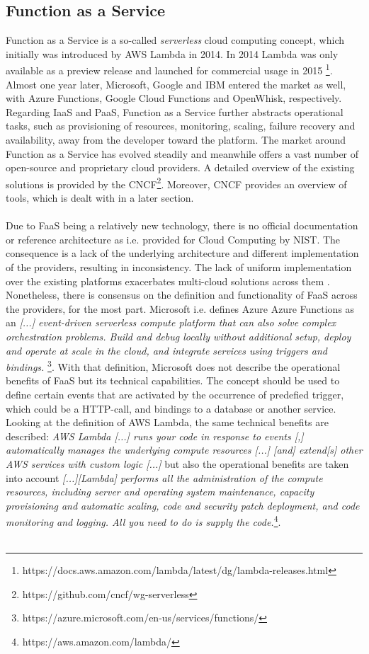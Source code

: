 \documentclass[11pt]{article}
\begin{document}
\subsection{Function as a Service}
Function as a Service is a so-called \textit{serverless} cloud computing concept, which initially was introduced by AWS Lambda in 2014. In 2014 Lambda was only available as a preview release and launched for commercial usage in 2015 \footnote{https://docs.aws.amazon.com/lambda/latest/dg/lambda-releases.html}. Almost one year later, Microsoft, Google and IBM entered the market as well, with Azure Functions, Google Cloud Functions and OpenWhisk, respectively. Regarding IaaS and PaaS, Function as a Service further abstracts operational tasks, such as provisioning of resources, monitoring, scaling, failure recovery and availability, away from the developer toward the platform. The market around Function as a Service has evolved steadily and meanwhile offers a vast number of open-source and proprietary cloud providers. A detailed overview of the existing solutions is provided by the CNCF\footnote{https://github.com/cncf/wg-serverless}. Moreover, CNCF provides an overview of tools, which is dealt with in a later section.\\\\ 
Due to FaaS being a relatively new technology, there is no official documentation or reference architecture as i.e. provided for Cloud Computing by NIST. The consequence is a lack of the underlying architecture and different implementation of the providers, resulting in inconsistency. The lack of uniform implementation over the existing platforms exacerbates multi-cloud solutions across them \cite{mell2011nist}.
Nonetheless, there is consensus on the definition and functionality of FaaS across the providers, for the most part. Microsoft i.e. defines Azure Azure Functions as an \glqq \textit{[...] event-driven serverless compute platform that can also solve complex orchestration problems. Build and debug locally without additional setup, deploy and operate at scale in the cloud, and integrate services using triggers and bindings.} \grqq{}\footnote{https://azure.microsoft.com/en-us/services/functions/}. With that definition, Microsoft does not describe the operational benefits of FaaS but its technical capabilities. The concept should be used to define certain events that are activated by the occurrence of predefied trigger, which could be a HTTP-call, and bindings to a database or another service. Looking at the definition of AWS Lambda, the same technical benefits are described: \glqq \textit{AWS Lambda [...] runs your code in response to events [,] automatically manages the underlying compute resources [...] [and] extend[s] other AWS services with custom logic [...]}\grqq{} but also the operational benefits are taken into account \glqq \textit{[...][Lambda] performs all the administration of the compute resources, including server and operating system maintenance, capacity provisioning and automatic scaling, code and security patch deployment, and code monitoring and logging. All you need to do is supply the code.}\grqq{}\footnote{https://aws.amazon.com/lambda/}.\\\\
\end{document}
